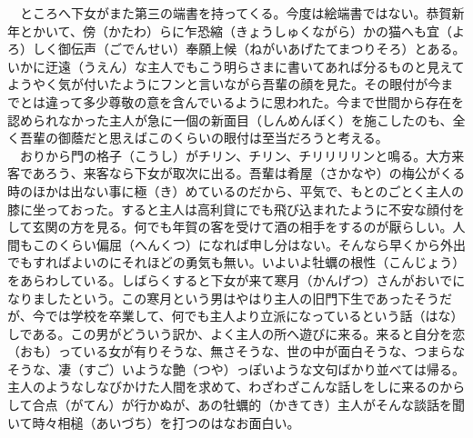 　ところへ下女がまた第三の端書を持ってくる。今度は絵端書ではない。恭賀新年とかいて、傍（かたわ）らに乍恐縮（きょうしゅくながら）かの猫へも宜（よろ）しく御伝声（ごでんせい）奉願上候（ねがいあげたてまつりそろ）とある。いかに迂遠（うえん）な主人でもこう明らさまに書いてあれば分るものと見えてようやく気が付いたようにフンと言いながら吾輩の顔を見た。その眼付が今までとは違って多少尊敬の意を含んでいるように思われた。今まで世間から存在を認められなかった主人が急に一個の新面目（しんめんぼく）を施こしたのも、全く吾輩の御蔭だと思えばこのくらいの眼付は至当だろうと考える。\\
　おりから門の格子（こうし）がチリン、チリン、チリリリリンと鳴る。大方来客であろう、来客なら下女が取次に出る。吾輩は肴屋（さかなや）の梅公がくる時のほかは出ない事に極（き）めているのだから、平気で、もとのごとく主人の膝に坐っておった。すると主人は高利貸にでも飛び込まれたように不安な顔付をして玄関の方を見る。何でも年賀の客を受けて酒の相手をするのが厭らしい。人間もこのくらい偏屈（へんくつ）になれば申し分はない。そんなら早くから外出でもすればよいのにそれほどの勇気も無い。いよいよ牡蠣の根性（こんじょう）をあらわしている。しばらくすると下女が来て寒月（かんげつ）さんがおいでになりましたという。この寒月という男はやはり主人の旧門下生であったそうだが、今では学校を卒業して、何でも主人より立派になっているという話（はな）しである。この男がどういう訳か、よく主人の所へ遊びに来る。来ると自分を恋（おも）っている女が有りそうな、無さそうな、世の中が面白そうな、つまらなそうな、凄（すご）いような艶（つや）っぽいような文句ばかり並べては帰る。主人のようなしなびかけた人間を求めて、わざわざこんな話しをしに来るのからして合点（がてん）が行かぬが、あの牡蠣的（かきてき）主人がそんな談話を聞いて時々相槌（あいづち）を打つのはなお面白い。\\
